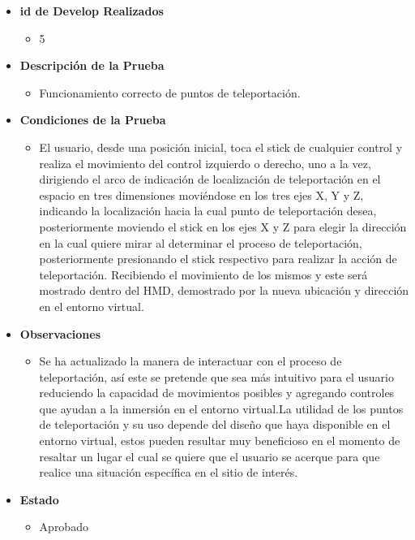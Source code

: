 \begin{itemize}
    \item \textbf{id de Develop Realizados}
    \begin{itemize}
        \item 5
    \end{itemize}
    \item \textbf{Descripción de la Prueba}
    \begin{itemize}
        \item Funcionamiento correcto de puntos de teleportación.
    \end{itemize}
    \item \textbf{Condiciones de la Prueba}
    \begin{itemize}
        \item 
        El usuario, desde una posición inicial, toca el stick de cualquier control y realiza el movimiento del control izquierdo o derecho, uno a la vez, dirigiendo el arco de indicación de localización de teleportación en el espacio en tres dimensiones moviéndose en los tres ejes X, Y y Z, indicando la localización hacia la cual punto de teleportación desea, posteriormente moviendo el stick en los ejes X y Z para elegir la dirección en la cual quiere mirar al determinar el proceso de teleportación, posteriormente presionando el stick respectivo para realizar la acción de teleportación. Recibiendo el movimiento de los mismos y este será mostrado dentro del HMD, demostrado por la nueva ubicación y dirección en el entorno virtual.       
    \end{itemize}
    \item \textbf{Observaciones}
    \begin{itemize}
        \item Se ha actualizado la manera de interactuar con el proceso de teleportación, así este se pretende que sea más intuitivo para el usuario reduciendo la capacidad de movimientos posibles y agregando controles que ayudan a la inmersión en el entorno virtual.La utilidad de los puntos de teleportación y su uso depende del diseño que haya disponible en el entorno virtual, estos pueden resultar muy beneficioso en el momento de resaltar un lugar el cual se quiere que el usuario se acerque para que realice una situación específica en el sitio de interés.
    \end{itemize}
    \item \textbf{Estado}
    \begin{itemize}
        \item Aprobado

\end{itemize}
\end{itemize}
